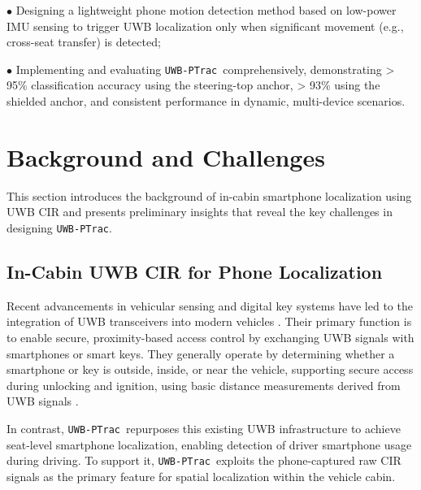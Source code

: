 \documentclass[sigconf]{acmart}
\newcommand{\name}{{{\tt UWB-PTrac}}}
\begin{document}
$\bullet$ Designing a lightweight phone motion detection method based on 
low-power IMU sensing to trigger UWB localization only when significant 
movement (e.g., cross-seat transfer) is detected;

$\bullet$ Implementing and evaluating \name\ comprehensively, demonstrating
> 95\% classification accuracy using the steering-top anchor, > 93\% using the shielded
anchor, and consistent performance in dynamic, multi-device scenarios.


\section{Background and Challenges}
\label{sec:background}
This section introduces the background of in-cabin smartphone localization 
using UWB CIR and presents preliminary insights that reveal the key challenges 
in designing \name.

\subsection{In-Cabin UWB CIR for Phone Localization}
%
Recent advancements in vehicular sensing and digital key systems have led to 
the integration of UWB transceivers into modern vehicles 
\cite{Bmw_2022,tesla_model3_manual_2025,hyundai_digital_key_2025}.
%
% 
Their primary function is to enable secure, proximity-based access control 
by exchanging UWB signals with smartphones or smart keys.
%
They generally operate by determining whether a smartphone or key is outside, 
inside, or near the vehicle, supporting secure access during unlocking and 
ignition, using basic distance measurements derived from UWB signals 
\cite{Ultra-WidebandCCC,Bmw_2022,tesla_model3_manual_2025}.

In contrast, \name\ repurposes this existing UWB infrastructure to achieve 
seat-level smartphone localization, enabling detection of driver smartphone 
usage during driving.
%
To support it, \name\ exploits the phone-captured raw CIR signals
as the primary feature for spatial localization within the vehicle cabin.
\end{document}
